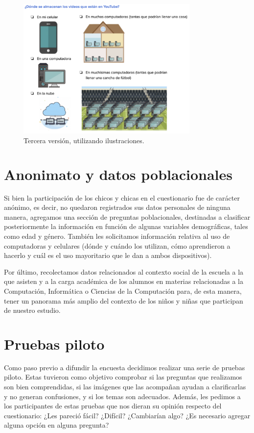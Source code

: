 \begin{figure}[h]
    \centering
    \includegraphics[width=0.8\textwidth]{images/4.png} 
    \caption{Tercera versión, utilizando ilustraciones.}
    \label{fig:cuest4}
\end{figure}

\newpage

\section{Anonimato y datos poblacionales}

Si bien la participación de los chicos y chicas en el cuestionario fue de carácter anónimo, es decir, no quedaron registrados sus datos personales de ninguna manera, agregamos una sección de preguntas poblacionales, destinadas a clasificar posteriormente la información en función de algunas variables demográficas, tales como edad y género. También les solicitamos información relativa al uso de computadoras y celulares (dónde y cuándo los utilizan, cómo aprendieron a hacerlo y cuál es el uso mayoritario que le dan a ambos dispositivos).     

Por último, recolectamos datos relacionados al contexto social de la escuela a la que asisten y a la carga académica de los alumnos en materias relacionadas a la Computación, Informática o Ciencias de la Computación para, de esta manera, tener un panorama más amplio del contexto de los niños y niñas que participan de nuestro estudio.

\section{Pruebas piloto}

Como paso previo a difundir la encuesta decidimos realizar una serie de pruebas piloto. Estas tuvieron como objetivo comprobar si las preguntas que realizamos son bien comprendidas, si las imágenes que las acompañan ayudan a clarificarlas y no generan confusiones, y si los temas son adecuados. Además, les pedimos a los participantes de estas pruebas que nos dieran su opinión respecto del cuestionario: ¿Les pareció fácil? ¿Difícil? ¿Cambiarían algo? ¿Es necesario agregar alguna opción en alguna pregunta?

